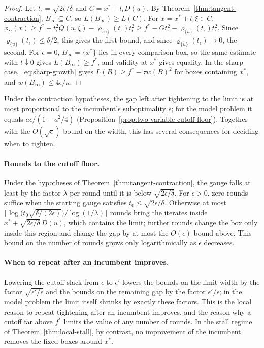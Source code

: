 \begin{proof}
Let $t_\epsilon=\sqrt{2\epsilon/\delta}$ and $C=x^*+t_\epsilon D(u)$. By
Theorem~\ref{thm:tangent-contraction}, $B_\infty\subseteq C$, so $L(B_\infty)\ge L(C)$.
For $x=x^*+t_\epsilon\xi\in C$,
$\phi_C(x)\ge f^*+t_\epsilon^2Q(u,\xi)-\varrho_{\{u\}}(t_\epsilon)t_\epsilon^2
\ge f^*-Gt_\epsilon^2-\varrho_{\{u\}}(t_\epsilon)t_\epsilon^2$. Since
$\varrho_{\{u\}}(t_\epsilon)\le\delta/2$, this gives the first bound, and since
$\varrho_{\{u\}}(t_\epsilon)\to0$, the second. For $\epsilon=0$,
$B_\infty=\{x^*\}$ lies in every comparison box, so the same estimate with
$t\downarrow0$ gives $L(B_\infty)\ge f^*$, and validity at $x^*$ gives equality.
In the sharp case,~\eqref{eq:sharp-growth} gives $L(B)\ge f^*-\tau w(B)^2$
for boxes containing $x^*$, and $w(B_\infty)\le4\epsilon/\kappa$.
\end{proof}

Under the contraction hypotheses, the gap left after tightening to the
limit is at most proportional to the incumbent's suboptimality $\epsilon$;
for the model problem it equals $a\epsilon/(1-a^2/4)$
(Proposition~\ref{prop:two-variable-cutoff-floor}). Together with the
$O(\sqrt\epsilon)$ bound on the width, this has several consequences for
deciding when to tighten.

\paragraph{Rounds to the cutoff floor.} Under the hypotheses of
Theorem~\ref{thm:tangent-contraction}, the gauge falls at least by the
factor $\lambda$ per round until it is below $\sqrt{2\epsilon/\delta}$.
For $\epsilon>0$, zero rounds suffice when the starting gauge satisfies
$t_0\le\sqrt{2\epsilon/\delta}$. Otherwise at most
$\bigl\lceil\log\bigl(t_0\sqrt{\delta/(2\epsilon)}\bigr)/\log(1/\lambda)\bigr\rceil$
rounds bring the iterates inside $x^*+\sqrt{2\epsilon/\delta}\,D(u)$, which
contains the limit; further rounds change the box only inside this region
and change the gap by at most the $O(\epsilon)$ bound above. This bound on
the number of rounds grows only logarithmically as $\epsilon$ decreases.

\paragraph{When to repeat after an incumbent improves.} Lowering the
cutoff slack from $\epsilon$ to $\epsilon'$ lowers the bounds on the limit
width by the factor $\sqrt{\epsilon'/\epsilon}$ and the bounds on the remaining
gap by the factor $\epsilon'/\epsilon$; in the model problem the limit itself
shrinks by exactly these factors. This is the local reason to repeat
tightening after an incumbent improves, and the reason why a cutoff far
above $f^*$ limits the value of any number of rounds. In the stall regime
of Theorem~\ref{thm:local-stall}, by contrast, no improvement of the
incumbent removes the fixed boxes around $x^*$.

